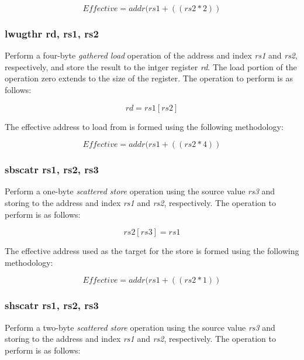\documentclass{article}
\begin{document}
\begin{equation}
Effective = addr(rs1 + ((rs2 * 2))
\end{equation}

\subsubsection{lwugthr rd, rs1, rs2}

Perform a four-byte \emph{gathered load} operation of the address and
index \emph{rs1} and \emph{rs2}, respectively, and store the result
to the intger register \emph{rd}.  The load portion of the operation
zero extends to the size of the register.
The operation to perform is as follows:

\begin{equation}
rd = rs1[rs2]
\end{equation}

The effective address to load
from is formed using the following methodology:

\begin{equation}
Effective = addr(rs1 + ((rs2 * 4))
\end{equation}


\subsubsection{sbscatr rs1, rs2, rs3}

Perform a one-byte \emph{scattered store} operation using the 
source value \emph{rs3} and storing to the address and index
\emph{rs1} and \emph{rs2}, respectively.  The operation to
perform is as follows: 

\begin{equation}
rs2[rs3] = rs1
\end{equation}

The effective address used as the target
for the store is formed using the following methodology:

\begin{equation}
Effective = addr(rs1 + ((rs2 * 1))
\end{equation}

\subsubsection{shscatr rs1, rs2, rs3}

Perform a two-byte \emph{scattered store} operation using the 
source value \emph{rs3} and storing to the address and index
\emph{rs1} and \emph{rs2}, respectively.  The operation to
perform is as follows: 
\end{document}
